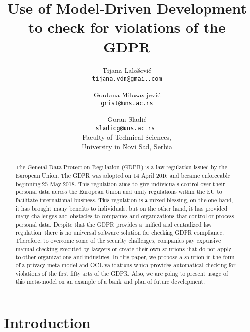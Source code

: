 \documentclass[11pt,english]{article}
\begin{document}
\title{Use of Model-Driven Development to check for violations of the GDPR}
\author{
  Tijana Lalošević\\
  \texttt{tijana.vdn@gmail.com}
  \and
  Gordana Milosavljević\\
  \texttt{grist@uns.ac.rs}
  \and
  Goran Sladić\\
  \texttt{sladicg@uns.ac.rs }
  \\Faculty of Technical Sciences,\\ University in Novi Sad, Serbia
}


\date{}
\maketitle


\begin{abstract}
The General Data Protection Regulation (GDPR) is a law regulation issued by the European Union. The GDPR was adopted on 14 April 2016 and became enforceable beginning 25 May 2018. This regulation aims to give individuals control over their personal data across the European Union and unify regulations within the EU to facilitate international business. This regulation is a mixed blessing, on the one hand, it has brought many benefits to individuals, but on the other hand, it has provided many challenges and obstacles to companies and organizations that control or process personal data. Despite that the GDPR provides a unified and centralized law regulation, there is no universal software solution for checking GDPR compliance. Therefore, to overcome some of the security challenges, companies pay expensive manual checking executed by lawyers or create their own solutions that do not apply to other organizations and industries. In this paper, we propose a solution in the form of a privacy meta-model and OCL validations which provides automatical checking for violations of the first fifty arts of the GDPR. Also, we are going to present usage of this meta-model on an example of a bank and plan of future development.
\end{abstract}

\section{Introduction}
\end{document}
